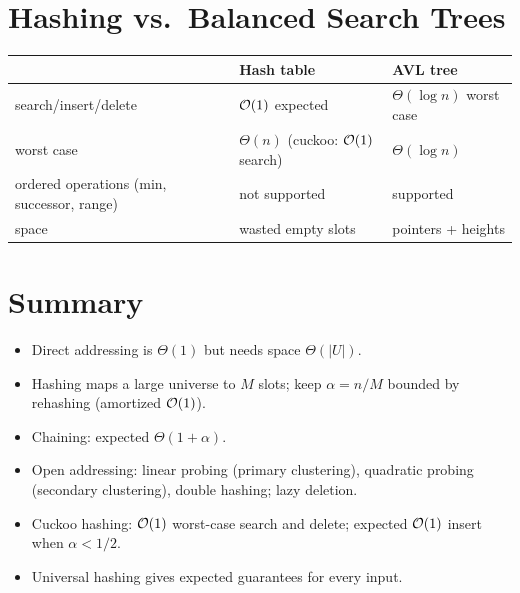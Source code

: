 \section{Hashing vs.\ Balanced Search Trees}

\begin{center}
\begin{tabular}{lll}
\toprule
 & Hash table & AVL tree\\
\midrule
search/insert/delete & $\mathcal{O}(1)$ expected & $\Theta(\log n)$ worst case\\
worst case & $\Theta(n)$ (cuckoo: $\mathcal{O}(1)$ search) & $\Theta(\log n)$\\
ordered operations (min, successor, range) & not supported & supported\\
space & wasted empty slots & pointers + heights\\
\bottomrule
\end{tabular}
\end{center}

\section{Summary}
\begin{itemize}
  \item Direct addressing is $\Theta(1)$ but needs space $\Theta(|U|)$.
  \item Hashing maps a large universe to $M$ slots; keep $\alpha = n/M$ bounded by
        rehashing (amortized $\mathcal{O}(1)$).
  \item Chaining: expected $\Theta(1 + \alpha)$.
  \item Open addressing: linear probing (primary clustering), quadratic probing
        (secondary clustering), double hashing; lazy deletion.
  \item Cuckoo hashing: $\mathcal{O}(1)$ worst-case search and delete; expected $\mathcal{O}(1)$
        insert when $\alpha < 1/2$.
  \item Universal hashing gives expected guarantees for every input.
\end{itemize}
